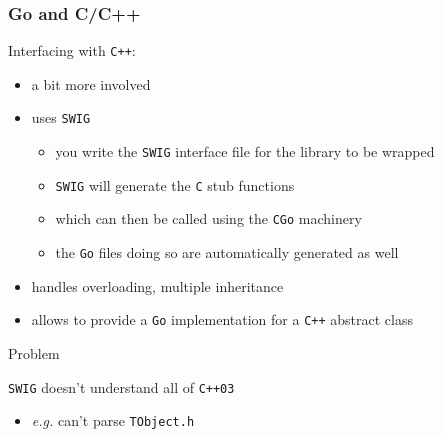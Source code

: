 \documentclass[bigger]{beamer}
\begin{document}
\begin{frame}
\frametitle{Go and C/C++}
\label{sec-1-22}


Interfacing with \verb~C++~:

\begin{itemize}
\item a bit more involved
\item uses \verb~SWIG~
\begin{itemize}
\item you write the \verb~SWIG~ interface file for the library to be wrapped
\item \verb~SWIG~ will generate the \verb~C~ stub functions
\item which can then be called using the \verb~CGo~ machinery
\item the \verb~Go~ files doing so are automatically generated as well
\end{itemize}
\item handles overloading, multiple inheritance
\item allows to provide a \verb~Go~ implementation for a \verb~C++~ abstract class
\end{itemize}
\begin{alertblock}{Problem}
\label{sec-1-22-1}

    \verb~SWIG~ doesn't understand all of \verb~C++03~
\begin{itemize}
\item \emph{e.g.} can't parse \verb~TObject.h~
\end{itemize}
\end{alertblock}
\end{frame}
\end{document}
